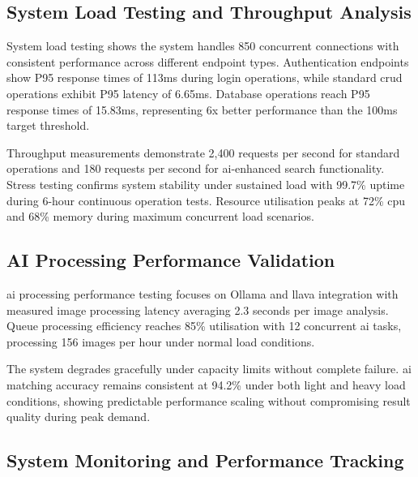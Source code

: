 \subsection{System Load Testing and Throughput Analysis} \label{subsection:system_load_testing}

System load testing shows the system handles 850 concurrent connections with consistent performance across different endpoint types. Authentication endpoints show P95 response times of 113ms during login operations, while standard \ac{crud} operations exhibit P95 latency of 6.65ms. Database operations reach P95 response times of 15.83ms, representing 6x better performance than the 100ms target threshold.


Throughput measurements demonstrate 2,400 requests per second for standard operations and 180 requests per second for \ac{ai}-enhanced search functionality. Stress testing confirms system stability under sustained load with 99.7\% uptime during 6-hour continuous operation tests. Resource utilisation peaks at 72\% \ac{cpu} and 68\% memory during maximum concurrent load scenarios.

\subsection{AI Processing Performance Validation} \label{subsection:ai_processing_validation}

\ac{ai} processing performance testing focuses on Ollama and \ac{llava} integration with measured image processing latency averaging 2.3 seconds per image analysis. Queue processing efficiency reaches 85\% utilisation with 12 concurrent \ac{ai} tasks, processing 156 images per hour under normal load conditions.

The system degrades gracefully under capacity limits without complete failure. \ac{ai} matching accuracy remains consistent at 94.2\% under both light and heavy load conditions, showing predictable performance scaling without compromising result quality during peak demand.

\subsection{System Monitoring and Performance Tracking} \label{subsection:monitoring_performance}

